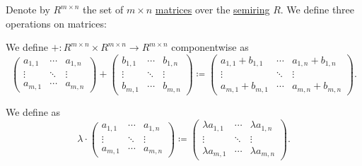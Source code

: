 \begin{proposition}\label{thm:matrix_algebra}
  Denote by \( R^{m \times n} \) the set of \( m \times n \) \hyperref[def:array/matrix]{matrices} over the \hyperref[def:semiring]{semiring} \( R \). We define three operations on matrices:
  \begin{thmenum}
     We define  \( +: R^{m \times n} \times R^{m \times n} \to R^{m \times n} \) componentwise as
    \begin{equation*}
      \begin{pmatrix}
        a_{1,1} & \cdots & a_{1,n} \\
        \vdots  & \ddots & \vdots  \\
        a_{m,1} & \cdots & a_{m,n}
      \end{pmatrix}
      +
      \begin{pmatrix}
        b_{1,1} & \cdots & b_{1,n} \\
        \vdots  & \ddots & \vdots  \\
        b_{m,1} & \cdots & b_{m,n}
      \end{pmatrix}
      \coloneqq
      \begin{pmatrix}
        a_{1,1} + b_{1,1} & \cdots & a_{1,n} + b_{1,n} \\
        \vdots            & \ddots & \vdots            \\
        a_{m,1} + b_{m,1} & \cdots & a_{m,n} + b_{m,n}
      \end{pmatrix}.
    \end{equation*}

     We define  as
    \begin{equation*}
       \lambda \cdot \begin{pmatrix}
        a_{1,1} & \cdots & a_{1,n} \\
        \vdots  & \ddots & \vdots  \\
        a_{m,1} & \cdots & a_{m,n}
      \end{pmatrix}
      \coloneqq
      \begin{pmatrix}
        \lambda a_{1,1} & \cdots & \lambda a_{1,n} \\
        \vdots          & \ddots & \vdots          \\
        \lambda a_{m,1} & \cdots & \lambda a_{m,n}
      \end{pmatrix}.
    \end{equation*}


\end{thmenum}
\end{proposition}
